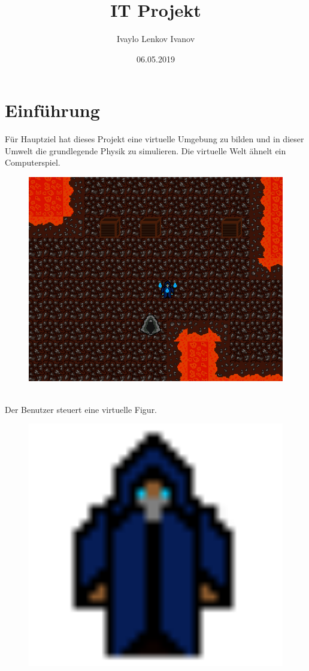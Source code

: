 \documentclass {article}
\title{IT Projekt}
\date{06.05.2019}
\author{Ivaylo Lenkov Ivanov}
\begin{document}
\begin{titlepage}
\maketitle
\end{titlepage}

\section{Einführung}
Für Hauptziel hat dieses Projekt eine virtuelle Umgebung zu bilden und in dieser Umwelt die grundlegende Physik zu simulieren. Die virtuelle Welt ähnelt ein Computerspiel. \\
\begin{figure}[h]
  \includegraphics[scale=0.25]{VirtualEnvironment}
\end{figure} \\
Der Benutzer steuert eine virtuelle Figur. \\
\begin{figure}[h]
  \includegraphics[scale=0.10]{MageCharacter}
\end{figure} \\
\end{document}
